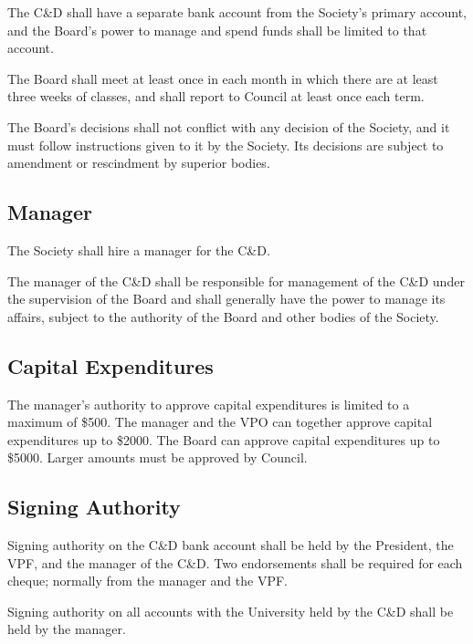The C\&D shall have a separate bank account from the Society's primary account,
and the Board's power to manage and spend funds shall be limited to that
account.

The Board shall meet at least once in each month in which there are at least
three weeks of classes, and shall report to Council at least once each term.

The Board's decisions shall not conflict with any decision of the Society, and
it must follow instructions given to it by the Society. Its decisions are
subject to amendment or rescindment by superior bodies.

\subsection{Manager}
The Society shall hire a manager for the C\&D.

The manager of the C\&D shall be responsible for management of the C\&D under
the supervision of the Board and shall generally have the power to manage its
affairs, subject to the authority of the Board and other bodies of the Society.

\subsection{Capital Expenditures}
The manager's authority to approve capital expenditures is limited to
a maximum of \$500. The manager and the VPO can together approve capital
expenditures up to \$2000. The Board can approve capital expenditures up to
\$5000. Larger amounts must be approved by Council.

\subsection{Signing Authority}
Signing authority on the C\&D bank account shall be held by the President,
the VPF, and the manager of the C\&D. Two endorsements shall be required for
each cheque; normally from the manager and the VPF.

Signing authority on all accounts with the University held by the C\&D shall
be held by the manager.
